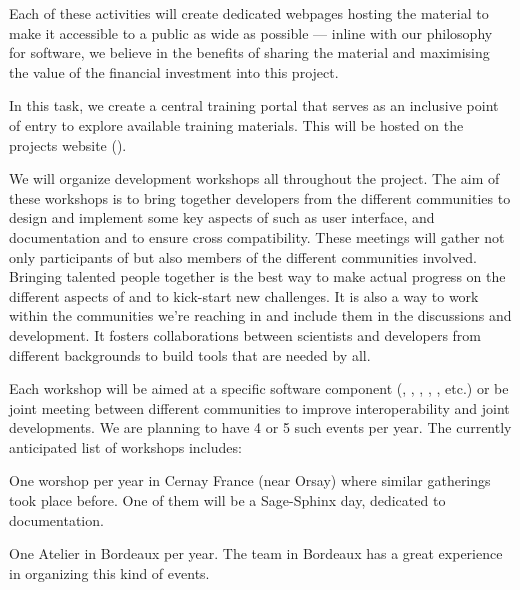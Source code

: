 \begin{workpackage}
\begin{tasklist}
\begin{task}[title=Training and training portal,
id=training-portal,lead=PS,PM=1,wphases=0-1]
Each of these activities will create dedicated webpages hosting the
material to make it accessible to a public as wide as possible ---
inline with our philosophy for software, we believe in the benefits of
sharing the material and maximising the value of the financial
investment into this project.

In this task, we create a central \TheProject training portal that
serves as an inclusive point of entry to explore available training
materials. This will be hosted on the projects website ().
\end{task}

\begin{task}[title=Community building: development workshops, lead=PS,PM=24, partners={UB,UK,SR,SA,USH}, id=devel-workshops, wphases=0-48]

  We will organize development workshops all throughout the
  project. The aim of these workshops is to bring together developers
  from the different communities to design and implement some key
  aspects of \TheProject such as user interface, and documentation and
  to ensure cross compatibility. These meetings will gather not only
  participants of \TheProject but also members of the different
  communities involved. Bringing talented people together is the best
  way to make actual progress on the different aspects of \TheProject
  and to kick-start new challenges. It is also a way to work within
  the communities we're reaching in and include them in the discussions
  and development. It fosters collaborations between scientists and
  developers from different backgrounds to build tools that are needed
  by all.

  Each workshop will be aimed at a specific software component (\Sage,
  \GAP, \SMC, \IPython, \Singular, etc.) or be joint meeting between
  different communities to improve interoperability and joint
  developments. We are planning to have 4 or 5 such events per
  year. The currently anticipated list of workshops includes:

\begin{compactitem}
\item One \Sage worshop per year in Cernay France (near Orsay) where
  similar gatherings took place before. One of them will be a
  Sage-Sphinx day, dedicated to documentation.

\item One Atelier \Pari in Bordeaux per year. The team in Bordeaux has
  a great experience in organizing this kind of \Pari events.


\end{compactitem}
\end{task}
\end{tasklist}
\end{workpackage}
